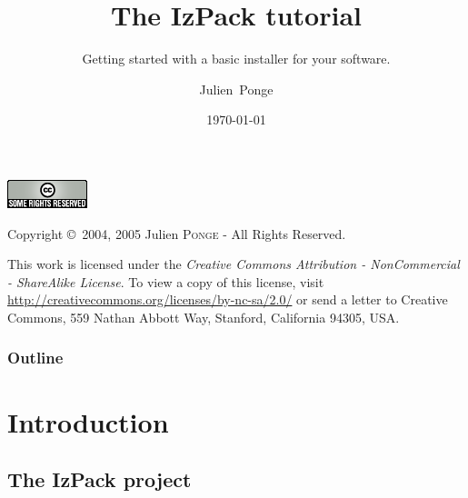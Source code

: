 \documentclass[compress,10pt]{beamer}
\title{The IzPack tutorial}
\subtitle{Getting started with a basic installer for your software.}
\author{Julien~Ponge\inst{1}}
\institute
{
  \inst{1}%
  \texttt{<julien@izforge.com>}\\
  \url{http://www.izforge.com/}\\
  IzPack project founder and current maintainer.
}
\date{\today}
\begin{document}

\begin{frame}
  \titlepage
\end{frame}


\begin{frame}[plain]

\footnotesize

\href{http://www.creativecommons.org/}{\includegraphics[scale=0.5]{cc}}

\vspace{2em}

Copyright \copyright~2004, 2005 Julien \textsc{Ponge} - All Rights Reserved.

\vspace{2em}
\sloppy
This work is licensed under the \textit{Creative Commons
Attribution - NonCommercial - ShareAlike License}. To view a copy of this license,
visit
\href{http://creativecommons.org/licenses/by-nc-sa/2.0/}{\url{http://creativecommons.org/licenses/by-nc-sa/2.0/}}
or send a letter to Creative Commons, 559 Nathan Abbott Way, Stanford,
California 94305, USA.

\end{frame}


\begin{frame}
  \frametitle{Outline}
  \tableofcontents
\end{frame}


\section{Introduction}


\subsection{The IzPack project}

\end{document}
